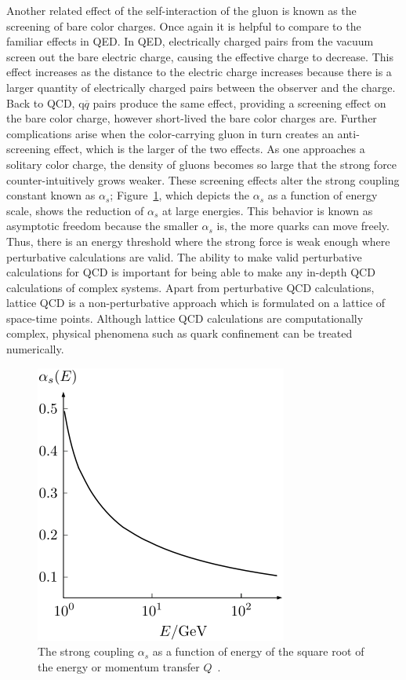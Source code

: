 Another related effect of the self-interaction of the gluon is known as the screening of bare color charges.  Once again it is helpful to compare to the familiar effects in QED. In QED, electrically charged pairs from the vacuum screen out the bare electric charge, causing the effective charge to decrease. This effect increases as the distance to the electric charge increases because there is a larger quantity of electrically charged pairs between the observer and the charge. Back to QCD, q$\overline{q}$ pairs produce the same effect, providing a screening effect on the bare color charge, however short-lived the bare color charges are. Further complications arise when the color-carrying gluon in turn creates an anti-screening effect, which is the larger of the two effects. As one approaches a solitary color charge, the density of gluons becomes so large that the strong force counter-intuitively grows weaker. These screening effects alter the strong coupling constant known as $\alpha_s$; Figure~\ref{fig:coupling_plot_ch1}, which depicts the $\alpha_s$ as a function of energy scale, shows the reduction of $\alpha_s$ at large energies. This behavior is known as asymptotic freedom because the smaller $\alpha_s$ is, the more quarks can move freely. Thus, there is an energy threshold where the strong force is weak enough where perturbative calculations are valid. The ability to make valid perturbative calculations for QCD is important for being able to make any in-depth QCD calculations of complex systems. Apart from perturbative QCD calculations, lattice QCD is a non-perturbative approach which is formulated on a lattice of space-time points. Although lattice QCD calculations are computationally complex, physical phenomena such as quark confinement can be treated numerically.

\begin{figure}[!ht]
\centering
\includegraphics[width=0.45\linewidth]{figs/coupling_constant.png}
\caption{The strong coupling $\alpha_s$ as a function of energy of the square root of the energy or momentum transfer $Q$~\cite{Bethke2009}.}
\label{fig:coupling_plot_ch1}
\end{figure}


